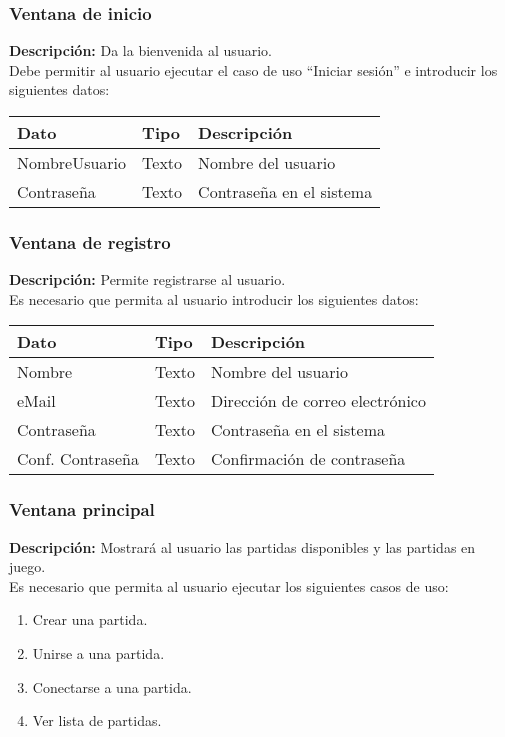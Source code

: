 \subsubsection{Ventana de inicio}
{\footnotesize

 \textbf{Descripción:} Da la bienvenida al usuario.\\ Debe permitir al usuario
ejecutar el
caso de uso ``Iniciar sesión'' e introducir los siguientes datos: \\

\begin{tabularx}{0.9\textwidth}{llX}
\hline
\textbf{Dato} & \textbf{Tipo} & \textbf{Descripción} \\
\hline
NombreUsuario & Texto & Nombre del usuario \\
Contraseña & Texto & Contraseña en el sistema \\
\hline
\end{tabularx}

\subsubsection{Ventana de registro}
{\footnotesize



 \textbf{Descripción:} Permite registrarse al usuario.\\
Es necesario que
permita al usuario introducir los siguientes datos: \\

\begin{tabularx}{0.9\textwidth}{llX}
\hline
\textbf{Dato} & \textbf{Tipo} & \textbf{Descripción} \\
\hline
Nombre & Texto & Nombre del usuario \\
eMail & Texto & Dirección de correo electrónico \\
Contraseña & Texto & Contraseña en el sistema \\
Conf. Contraseña & Texto & Confirmación de contraseña \\
\hline
\end{tabularx}

}

\subsubsection{Ventana principal}
{\footnotesize

 \textbf{Descripción:}  Mostrará al usuario las partidas disponibles y las
partidas en
juego.\\
Es necesario que
permita al usuario ejecutar los siguientes casos de uso: \\
\begin{enumerate}
\item Crear una partida.
\item Unirse a una partida.
\item Conectarse a una partida.
\item Ver lista de partidas.


\end{enumerate}}}
